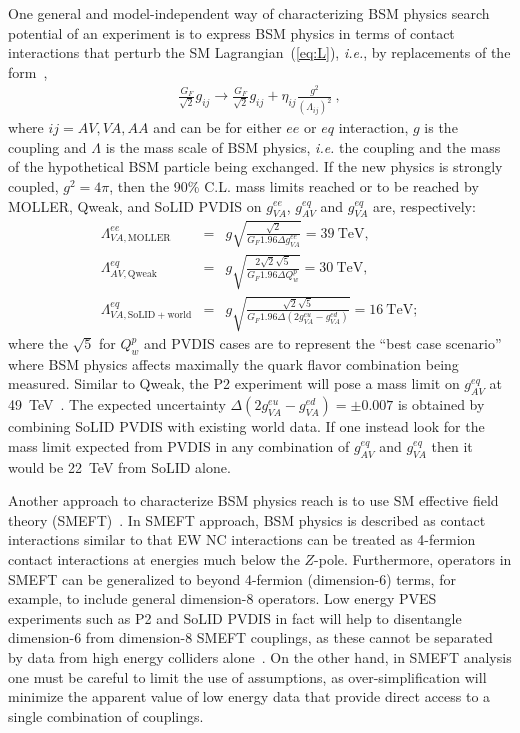 One general and model-independent way of characterizing BSM physics search potential of an experiment is to express BSM physics in terms of contact interactions that perturb the SM Lagrangian~(\ref{eq:L}), {\it i.e.}, by replacements of the form~\cite{Erler:2014fqa},
\begin{eqnarray}
\frac{G_F}{\sqrt{2}} g_{ij} \rightarrow \frac{G_F}{\sqrt{2}} g_{ij} + \eta_{ij}\frac{g^2}{(\Lambda_{ij})^2}\ ,
\label{eq:ciqmodified}
\end{eqnarray}
where $ij=AV,VA,AA$ and can be for either $ee$ or $eq$ interaction, $g$ is the coupling and $\Lambda$ is the mass scale of BSM physics, {\it i.e.} the coupling and the mass of the hypothetical BSM particle being exchanged. 
If the new physics is strongly coupled, $g^2 = 4\pi$, then the 90\% C.L. mass limits reached or to be reached by MOLLER, Qweak, and SoLID PVDIS on $g_{VA}^{ee}$, $g_{AV}^{eq}$ and $g_{VA}^{eq}$ are, respectively:
\begin{eqnarray}
 \Lambda_{VA, \mathrm{MOLLER}}^{ee}&=& g \sqrt{\frac{\sqrt{2}}{G_F 1.96\Delta g_{VA}^{ee}}}=39~\mathrm{TeV}, \\
 \Lambda_{AV, \mathrm{Qweak}}^{eq}&=& g \sqrt{\frac{2\sqrt{2}\sqrt{5}}{G_F 1.96\Delta Q_w^p}}=30~\mathrm{TeV},\\
 \Lambda_{VA, \mathrm{SoLID+world}}^{eq} &=& g \sqrt{\frac{\sqrt{2}\sqrt{5}}{G_F 1.96\Delta \left(2g_{VA}^{eu}-g_{VA}^{ed}\right)}}=16~\mathrm{TeV}; 
\end{eqnarray}
where the $\sqrt{5}$ for $Q_w^p$ and PVDIS cases are to represent the ``best case scenario'' where BSM physics affects maximally the quark flavor combination being measured. Similar to Qweak, the P2 experiment will pose a mass limit on $g_{AV}^{eq}$ at  49~TeV~\cite{Erler:2014fqa}. The expected uncertainty $\Delta\left(2g_{VA}^{eu}-g_{VA}^{ed}\right)=\pm 0.007$ is obtained by combining SoLID PVDIS with existing world data. If one instead look for the mass limit expected from PVDIS in any combination of $g_{AV}^{eq}$ and $g_{VA}^{eq}$ then it would be 22~TeV from SoLID alone. 

Another approach to characterize BSM physics reach is to use SM effective field theory (SMEFT)~\cite{Boughezal:2021kla}. In SMEFT approach, BSM physics is described as contact interactions similar to that EW NC interactions can be treated as  4-fermion contact interactions at energies much below the $Z$-pole. Furthermore, operators in SMEFT can be generalized to beyond 4-fermion (dimension-6) terms, for example, to include general dimension-8 operators. Low energy PVES experiments such as P2 and SoLID PVDIS in fact will help to disentangle dimension-6 from dimension-8 SMEFT couplings, as these cannot be separated by data from high energy colliders alone~\cite{Boughezal:2021kla}. On the other hand, in SMEFT analysis one must be careful to limit the use of assumptions, as over-simplification will minimize the apparent value of low energy data that provide direct access to a single combination of couplings.

